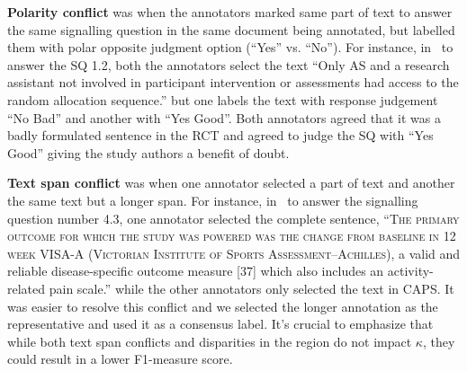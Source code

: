 \documentclass[sn-mathphys,Numbered]{sn-jnl}%
\theoremstyle{thmstyleone}%
\theoremstyle{thmstyletwo}%
\theoremstyle{thmstylethree}%
\begin{document}
\textbf{Polarity conflict} was when the annotators marked same part of text to answer the same signalling question in the same document being annotated, but labelled them with polar opposite judgment option (``Yes'' vs. ``No'').
For instance, in~\cite{solomons2020intramuscular} to answer the SQ 1.2, both the annotators select the text ``Only AS and a research assistant not involved in participant intervention or assessments had access to the random allocation sequence.'' but one labels the text with response judgement ``No Bad'' and another with ``Yes Good''.
Both annotators agreed that it was a badly formulated sentence in the RCT and agreed to judge the SQ with ``Yes Good'' giving the study authors a benefit of doubt. 

\textbf{Text span conflict} was when one annotator selected a part of text and another the same text but a longer span.
For instance, in~\cite{solomons2020intramuscular} to answer the signalling question number 4.3, one annotator selected the complete sentence, ``\textsc{The primary outcome for which the study was powered was the change from baseline in 12 week VISA-A (Victorian Institute of Sports Assessment–Achilles),} a valid and reliable disease-specific outcome measure [37] which also includes an activity-related pain scale.'' while the other annotators only selected the text in CAPS. 
It was easier to resolve this conflict and we selected the longer annotation as the representative and used it as a consensus label.
It's crucial to emphasize that while both text span conflicts and disparities in the region do not impact $\kappa$, they could result in a lower F1-measure score.
%
%
%
\end{document}
